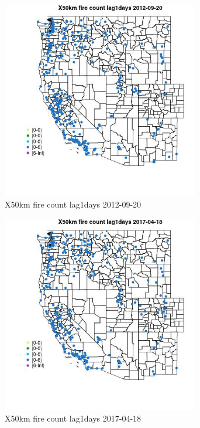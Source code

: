 \begin{figure} 
\centering  
\includegraphics[width=0.77\textwidth]{Code_Outputs/Report_ML_input_PM25_Step4_part_e_de_duplicated_aves_compiled_2019-05-14wNAs_MapObsX50km_fire_count_lag1days2012-09-20.jpg} 
\caption{\label{fig:Report_ML_input_PM25_Step4_part_e_de_duplicated_aves_compiled_2019-05-14wNAsMapObsX50km_fire_count_lag1days2012-09-20}X50km fire count lag1days 2012-09-20} 
\end{figure} 
 

\begin{figure} 
\centering  
\includegraphics[width=0.77\textwidth]{Code_Outputs/Report_ML_input_PM25_Step4_part_e_de_duplicated_aves_compiled_2019-05-14wNAs_MapObsX50km_fire_count_lag1days2017-04-18.jpg} 
\caption{\label{fig:Report_ML_input_PM25_Step4_part_e_de_duplicated_aves_compiled_2019-05-14wNAsMapObsX50km_fire_count_lag1days2017-04-18}X50km fire count lag1days 2017-04-18} 
\end{figure} 
 

